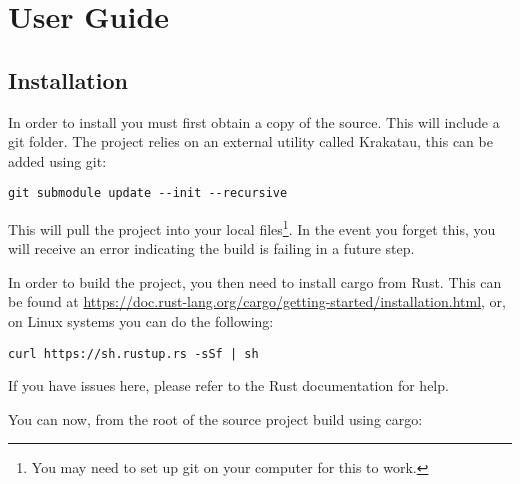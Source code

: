 \chapter{User Guide}

\section{Installation}

In order to install \rimp you must first obtain a copy of the source. This will include a git folder. The project relies on an external utility called Krakatau, this can be added using git:

\begin{lstlisting}
git submodule update --init --recursive
\end{lstlisting}

This will pull the project into your local files\footnote{You may need to set up git on your computer for this to work.}. In the event you forget this, you will receive an error indicating the build is failing in a future step.

In order to build the project, you then need to install cargo from Rust. This can be found at \url{https://doc.rust-lang.org/cargo/getting-started/installation.html}, or, on Linux systems you can do the following:

\begin{lstlisting}
curl https://sh.rustup.rs -sSf | sh
\end{lstlisting}

If you have issues here, please refer to the Rust documentation for help. 

You can now, from the root of the source project build \rimp using cargo:

